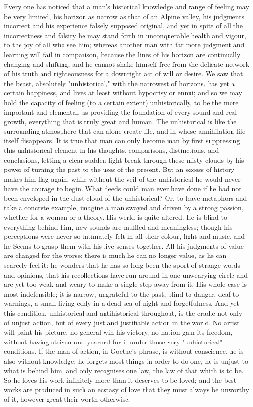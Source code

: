 Every one has noticed that a man's historical knowledge and range of
feeling may be very limited, his horizon as narrow as that of an
Alpine valley, his judgments incorrect and his experience falsely
supposed original, and yet in spite of all the incorrectness and
falsity he may stand forth in unconquerable health and vigour, to the
joy of all who see him; whereas another man with far more judgment
and learning will fail in comparison, because the lines of his
horizon are continually changing and shifting, and he cannot shake
himself free from the delicate network of his truth and righteousness
for a downright act of will or desire. We saw that the beast,
absolutely "unhistorical," with the narrowest of horizons, has yet a
certain happiness, and lives at least without hypocrisy or ennui; and
so we may hold the capacity of feeling (to a certain extent)
unhistorically, to be the more important and elemental, as providing
the foundation of every sound and real growth, everything that is
truly great and human. The unhistorical is like the surrounding
atmosphere that can alone create life, and in whose annihilation life
itself disappears. It is true that man can only become man by first
suppressing this unhistorical element in his thoughts, comparisons,
distinctions, and conclusions, letting a clear sudden light break
through these misty clouds by his power of turning the past to the
uses of the present. But an excess of history makes him flag again,
while without the veil of the unhistorical he would never have the
courage to begin. What deeds could man ever have done if he had not
been enveloped in the dust-cloud of the unhistorical? Or, to leave
metaphors and take a concrete example, imagine a man swayed and
driven by a strong passion, whether for a woman or a theory. His
world is quite altered. He is blind to everything behind him, new
sounds are muffled and meaningless; though his perceptions were never
so intimately felt in all their colour, light and music, and he Seems
to grasp them with his five senses together. All his judgments of
value are changed for the worse; there is much he can no longer
value, as he can scarcely feel it: he wonders that he has so long
been the sport of strange words and opinions, that his recollections
have run around in one unwearying circle and are yet too weak and
weary to make a single step away from it. His whole case is most
indefensible; it is narrow, ungrateful to the past, blind to danger,
deaf to warnings, a small living eddy in a dead sea of night and
forgetfulness. And yet this condition, unhistorical and
antihistorical throughout, is the cradle not only of unjust action,
but of every just and justifiable action in the world. No artist will
paint his picture, no general win his victory, no nation gain its
freedom, without having striven and yearned for it under those very
"unhistorical" conditions. If the man of action, in Goethe's phrase,
is without conscience, he is also without knowledge: he forgets most
things in order to do one, he is unjust to what is behind him, and
only recognises one law, the law of that which is to be. So he loves
his work infinitely more than it deserves to be loved; and the best
works are produced in such an ecstasy of love that they must always
be unworthy of it, however great their worth otherwise.

